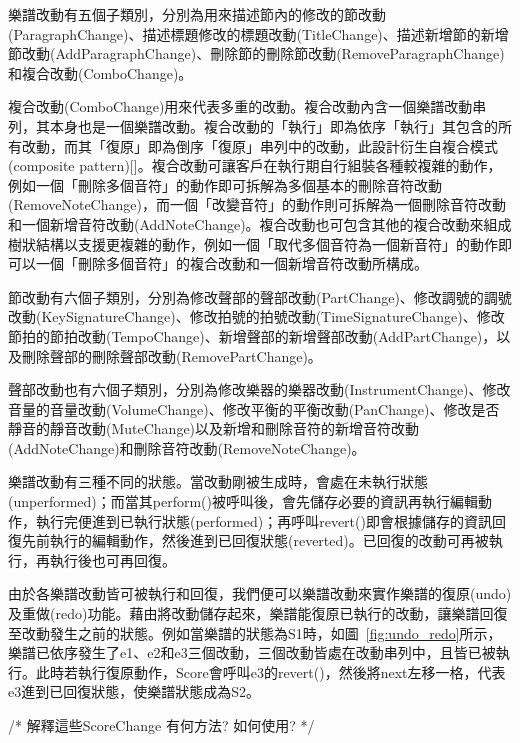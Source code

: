 \documentclass[12pt,a4paper,oneside]{report}
\begin{document}
樂譜改動有五個子類別，分別為用來描述節內的修改的節改動(ParagraphChange)、描述標題修改的標題改動(TitleChange)、描述新增節的新增節改動(AddParagraphChange)、刪除節的刪除節改動(RemoveParagraphChange)和複合改動(ComboChange)。

複合改動(ComboChange)用來代表多重的改動。複合改動內含一個樂譜改動串列，其本身也是一個樂譜改動。複合改動的「執行」即為依序「執行」其包含的所有改動，而其「復原」即為倒序「復原」串列中的改動，此設計衍生自複合模式(composite pattern)[]。複合改動可讓客戶在執行期自行組裝各種較複雜的動作，例如一個「刪除多個音符」的動作即可拆解為多個基本的刪除音符改動(RemoveNoteChange)，而一個「改變音符」的動作則可拆解為一個刪除音符改動和一個新增音符改動(AddNoteChange)。複合改動也可包含其他的複合改動來組成樹狀結構以支援更複雜的動作，例如一個「取代多個音符為一個新音符」的動作即可以一個「刪除多個音符」的複合改動和一個新增音符改動所構成。

節改動有六個子類別，分別為修改聲部的聲部改動(PartChange)、修改調號的調號改動(KeySignatureChange)、修改拍號的拍號改動(TimeSignatureChange)、修改節拍的節拍改動(TempoChange)、新增聲部的新增聲部改動(AddPartChange)，以及刪除聲部的刪除聲部改動(RemovePartChange)。

聲部改動也有六個子類別，分別為修改樂器的樂器改動(InstrumentChange)、修改音量的音量改動(VolumeChange)、修改平衡的平衡改動(PanChange)、修改是否靜音的靜音改動(MuteChange)以及新增和刪除音符的新增音符改動(AddNoteChange)和刪除音符改動(RemoveNoteChange)。

樂譜改動有三種不同的狀態。當改動剛被生成時，會處在未執行狀態(unperformed)；而當其perform()被呼叫後，會先儲存必要的資訊再執行編輯動作，執行完便進到已執行狀態(performed)；再呼叫revert()即會根據儲存的資訊回復先前執行的編輯動作，然後進到已回復狀態(reverted)。已回復的改動可再被執行，再執行後也可再回復。

由於各樂譜改動皆可被執行和回復，我們便可以樂譜改動來實作樂譜的復原(undo)及重做(redo)功能。藉由將改動儲存起來，樂譜能復原已執行的改動，讓樂譜回復至改動發生之前的狀態。例如當樂譜的狀態為S1時，如圖~\ref{fig:undo_redo}所示，樂譜已依序發生了e1、e2和e3三個改動，三個改動皆處在改動串列中，且皆已被執行。此時若執行復原動作，Score會呼叫e3的revert()，然後將next左移一格，代表e3進到已回復狀態，使樂譜狀態成為S2。

/*  
解釋這些ScoreChange 有何方法? 如何使用?   
*/ 
\end{document}
